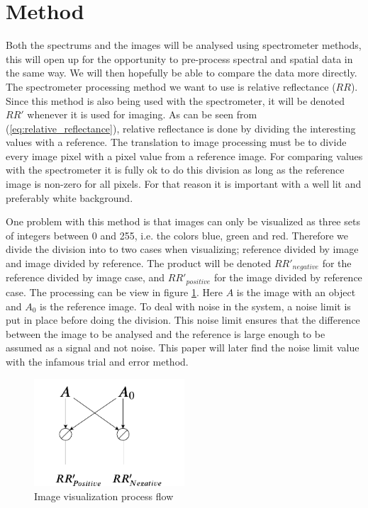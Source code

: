 \section{Method}
Both the spectrums and the images will be analysed using spectrometer methods, this will open up for the opportunity to pre-process spectral and spatial data in the same way. We will then hopefully be able to compare the data more directly. The spectrometer processing method we want to use is relative reflectance ($RR$). Since this method is also being used with the spectrometer, it will be denoted $RR'$ whenever it is used for imaging. As can be seen from (\ref{eq:relative_reflectance}), relative reflectance is done by dividing the interesting values with a reference. The translation to image processing must be to divide every image pixel with a pixel value from a reference image. For comparing values with the spectrometer it is fully ok to do this division as long as the reference image is non-zero for all pixels. For that reason it is important with a well lit and preferably white background. 


One problem with this method is that images can only be visualized as three sets of integers between 0 and 255, i.e. the colors blue, green and red. Therefore we divide the division into to two cases when visualizing; reference divided by image and image divided by reference. The product will be denoted $RR'_{negative}$ for the reference divided by image case, and $RR'_{positive}$ for the image divided by reference case. The processing can be view in figure \ref{fig:image_visualization_program_flow}. Here $A$ is the image with an object and $A_0$ is the reference image. To deal with noise in the system, a noise limit is put in place before doing the division. This noise limit ensures that the difference between the image to be analysed and the reference is large enough to be assumed as a signal and not noise. This paper will later find the noise limit value with the infamous trial and error method. 

\begin{figure}[h]
    \centering
    \includegraphics[width=0.5\textwidth]{figures/image_program_flow.pdf}
    \caption{Image visualization process flow}
    \label{fig:image_visualization_program_flow}
\end{figure}


